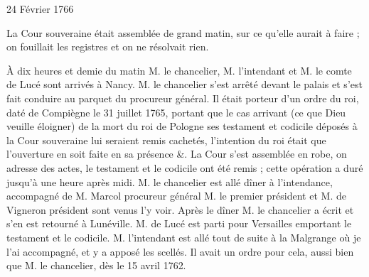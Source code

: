                      \begin{diary}{24 Février 1766}{}


                           La Cour souveraine était assemblée de grand matin,
                           sur ce qu'elle aurait à faire ; on fouillait les
                           registres et on ne résolvait rien. \bigskip


                         À dix heures et demie du matin M. le
                              chancelier, M.
                              l'intendant et M. le comte
                              de Lucé sont arrivés à Nancy. M. le chancelier
                           s'est arrêté devant le
                              palais et s'est fait
                           conduire au parquet du procureur
                              général.
                           Il était porteur d'un ordre du roi, daté
                           de Compiègne
                           le 31 juillet 1765, portant
                           que le cas arrivant (ce que Dieu veuille
                           éloigner) de la mort du roi de Pologne ses testament
                           et codicile déposés à la Cour
                              souveraine
                           lui seraient remis cachetés, l'intention
                           du roi était que
                           l'ouverture en soit faite
                           en sa présence \&. La Cour s'est assemblée
                           en robe, on adresse des actes, le testament et le codicile ont été remis ; cette
                           opération
                           a duré jusqu'à une heure après midi. M.
                              le chancelier est allé dîner à l'intendance,
                           accompagné de M. Marcol
                           procureur général
                           M. le
                              premier président et M. de Vigneron
                           président sont
                           venus l'y voir. Après le dîner M. le chancelier
                           a écrit et s'en est retourné à Lunéville.
                           M. de Lucé est parti pour
                              Versailles
                           emportant le testament et le codicile. M.
                              l'intendant est allé tout de suite à la
                              Malgrange où je l'ai accompagné, et y
                           a apposé les scellés. Il avait un ordre pour
                           cela, aussi bien que M. le
                              chancelier, dès
                           le 15 avril 1762. \bigskip



\end{diary}
